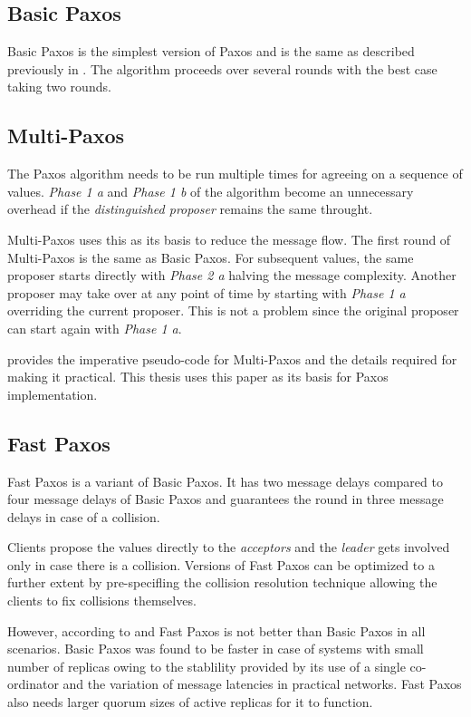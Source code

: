 \subsection{Basic Paxos}

Basic Paxos is the simplest version of Paxos and is the same as described 
previously in . The algorithm proceeds over several rounds
with the best case taking two rounds.

\subsection{Multi-Paxos}

The Paxos algorithm needs to be run multiple times for agreeing on a sequence of
values. \emph{Phase 1 a} and \emph{Phase 1 b} of the algorithm become 
an unnecessary overhead if the \emph{distinguished proposer} remains the same 
throught.

Multi-Paxos uses this as its basis to reduce the message flow. The first round 
of Multi-Paxos is the same as Basic Paxos. For subsequent values, the same
proposer starts directly with \emph{Phase 2 a} halving the message complexity.
Another proposer may take over at any point of time by starting with 
\emph{Phase 1 a} overriding the current proposer. This is not a problem since 
the original proposer can start again with \emph{Phase 1 a}.

\citet{Robbert2011} provides the imperative pseudo-code for Multi-Paxos and
the details required for making it practical. This thesis uses this paper as 
its basis for Paxos implementation.

\subsection{Fast Paxos}

Fast Paxos \citep{MSRTR2005112} is a variant of Basic Paxos. It has two
message delays compared to four message delays of Basic Paxos and guarantees
the round in three message delays in case of a collision.

Clients propose the values directly to the \emph{acceptors} and the 
\emph{leader} gets involved only in case there is a collision. Versions of Fast
Paxos can be optimized to a further extent by pre-specifling the collision
resolution technique allowing the clients to fix collisions themselves.

However, according to \citet{Vieira08theperformance} and \citet{Junqueira2007}
Fast Paxos is not better than Basic Paxos in all scenarios. Basic Paxos was 
found to be faster in case of systems with small number of replicas owing to 
the stablility provided by its use of a single co-ordinator and the variation
of message latencies in practical networks. Fast Paxos also needs larger quorum 
sizes of active replicas for it to function.


